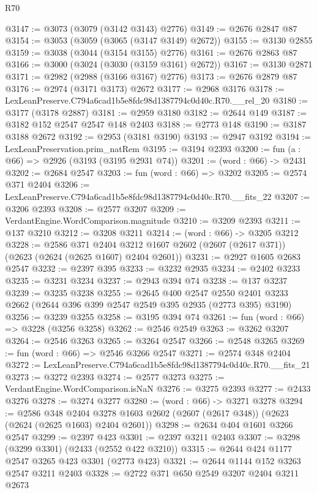 \begin{lexlean}{R70}
\begin{coremodule}
@3147 := @3073 (@3079 (@3142 @3143) @2776)
@3149 := @2676 @2847 @87
@3154 := @3053 (@3059 (@3065 (@3147 @3149) @2672))
@3155 := @3130 @2855
@3159 := @3038 (@3044 (@3154 @3155) @2776)
@3161 := @2676 @2863 @87
@3166 := @3000 (@3024 (@3030 (@3159 @3161) @2672))
@3167 := @3130 @2871
@3171 := @2982 (@2988 (@3166 @3167) @2776)
@3173 := @2676 @2879 @87
@3176 := @2974 (@3171 @3173) @2672
@3177 := @2968 @3176
@3178 := LexLeanPreserve.C794a6cad1b5e8fdc98d1387794c0d40c.R70.__rel_20
@3180 := @3177 (@3178 @2887)
@3181 := @2959 @3180
@3182 := @2644 @149
@3187 := @3182 @152 @2547 @2547 @148 @2403
@3188 := @2773 @148
@3190 := @3187 @3188 @2672
@3192 := @2953 (@3181 @3190)
@3193 := @2947 @3192
@3194 := LexLeanPreservation.prim_natRem
@3195 := @3194 @2393
@3200 := fun (a : @66) => @2926 (@3193 (@3195 @2931 @74))
@3201 := (word : @66) -> @2431
@3202 := @2684 @2547
@3203 := fun (word : @66) => @3202
@3205 := @2574 @371 @2404
@3206 := LexLeanPreserve.C794a6cad1b5e8fdc98d1387794c0d40c.R70.__fits_22
@3207 := @3206 @2393
@3208 := @2577 @3207
@3209 := VerdantEngine.WordComparison.magnitude
@3210 := @3209 @2393
@3211 := @137 @3210
@3212 := @3208 @3211
@3214 := (word : @66) -> @3205 @3212
@3228 := @2586
    @371
    @2404
    @3212
    @1607
    @2602
    (@2607 (@2617 @371))
    (@2623 (@2624 (@2625 @1607) @2404 @2601))
@3231 := @2927 @1605 @2683 @2547
@3232 := @2397 @395
@3233 := @3232 @2935
@3234 := @2402 @3233
@3235 := @3231 @3234
@3237 := @2943 @394 @74
@3238 := @137 @3237
@3239 := @3235 @3238
@3255 := @2645
    @400
    @2547
    @2550
    @2401
    @3233
    @2662
    (@2644 @396 @399 @2547 @2549 @395 @2935 (@2773 @395) @3190)
@3256 := @3239 @3255
@3258 := @3195 @394 @74
@3261 := fun (word : @66) => @3228 (@3256 @3258)
@3262 := @2546 @2549
@3263 := @3262 @3207
@3264 := @2546 @3263
@3265 := @3264 @2547
@3266 := @2548 @3265
@3269 := fun (word : @66) => @2546 @3266 @2547
@3271 := @2574 @348 @2404
@3272 := LexLeanPreserve.C794a6cad1b5e8fdc98d1387794c0d40c.R70.__fits_21
@3273 := @3272 @2393
@3274 := @2577 @3273
@3275 := VerdantEngine.WordComparison.isNaN
@3276 := @3275 @2393
@3277 := @2433 @3276
@3278 := @3274 @3277
@3280 := (word : @66) -> @3271 @3278
@3294 := @2586
    @348
    @2404
    @3278
    @1603
    @2602
    (@2607 (@2617 @348))
    (@2623 (@2624 (@2625 @1603) @2404 @2601))
@3298 := @2634 @404 @1601 @3266 @2547
@3299 := @2397 @423
@3301 := @2397 @3211 @2403
@3307 := @3298 (@3299 @3301) (@2433 (@2552 @422 @3210))
@3315 := @2644 @424 @1177 @2547 @3265 @423 @3301 (@2773 @423)
@3321 := @2644 @1144 @152 @3263 @2547 @3211 @2403
@3328 := @2722 @371 @650 @2549 @3207 @2404 @3211 @2673

\end{coremodule}
\end{lexlean}

